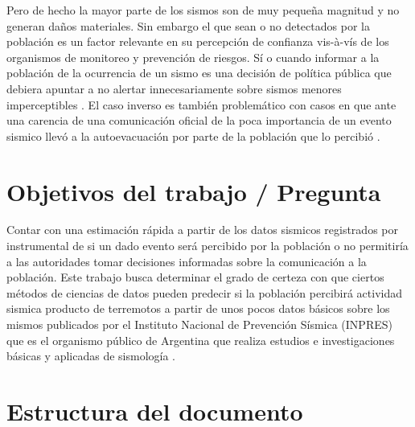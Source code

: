 \documentclass[a4paper]{report}
\begin{document}
Pero de hecho la mayor parte de los sismos son de muy pequeña magnitud y no generan daños materiales.
Sin embargo el que sean o no detectados por la población es un factor relevante en su percepción de confianza vis-à-vís de los organismos de monitoreo y prevención de riesgos.
Sí o cuando informar a la población de la ocurrencia de un sismo es una decisión de política pública que debiera apuntar a no alertar  innecesariamente sobre sismos menores imperceptibles \cite{saunders_j_k_twist_nodate}.
El caso inverso es también problemático con casos en que ante una carencia de una comunicación oficial de la poca importancia de un evento sismico llevó a la autoevacuación por parte de la población que lo percibió \cite{vaiciulyte_population_2022}. 


\section{Objetivos del trabajo / Pregunta}
Contar con una estimación rápida a partir de los datos sismicos registrados por instrumental de si un dado evento será percibido por la población o no permitiría a las autoridades tomar decisiones informadas sobre la comunicación a la población.
Este trabajo busca determinar el grado de certeza con que ciertos métodos de ciencias de datos pueden predecir si la población percibirá actividad sismica producto de terremotos a partir de unos pocos datos básicos sobre los mismos publicados por el Instituto Nacional de Prevención Sísmica (INPRES) que es el organismo público de Argentina que realiza estudios e investigaciones básicas y aplicadas de sismología \cite{noauthor_instituto_2022}.



\section{Estructura del documento}
\end{document}
